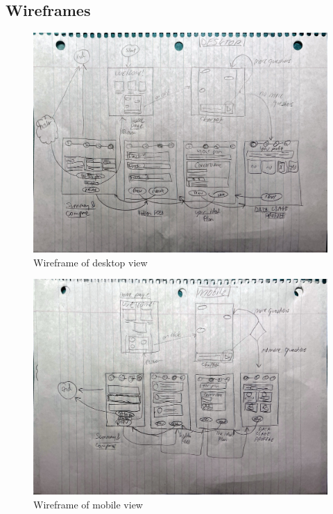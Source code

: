 \documentclass[conference]{IEEEtran}
\begin{document}
\subsection{Wireframes}
\begin{figure}[H]
    \centering
    \includegraphics[width=1\linewidth]{Desktop_wireframe.jpg}
    \caption{Wireframe of desktop view}
    \label{fig:user flow}
\end{figure}
\begin{figure}[H]
    \centering
    \includegraphics[width=1\linewidth]{Mobile_Wireframe.jpg}
    \caption{Wireframe of mobile view}
    \label{fig:user flow}
\end{figure}
\end{document}
